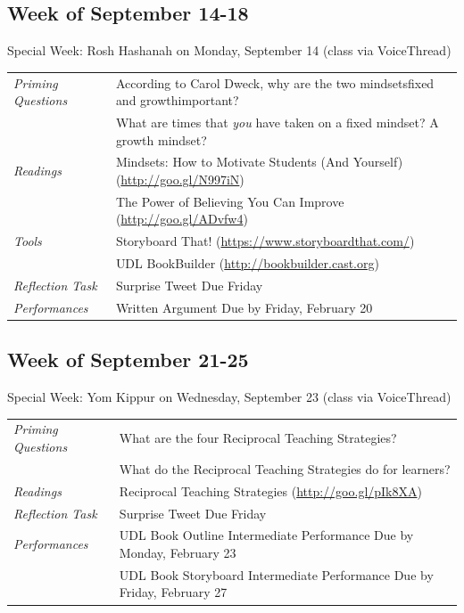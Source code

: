 \documentclass{tufte-handout}
\newcommand{\tabpq}{\faQuestionSign\medspace\textit{Priming Questions}}
\newcommand{\tabread}{\faBook\medspace\textit{Readings}}
\newcommand{\tabtools}{\faWrench\medspace\textit{Tools}}
\newcommand{\tabtweet}{\faLightbulb\medspace\textit{Reflection Task} & Surprise Tweet Due Friday \\}
\newcommand{\tabperformance}{\faTasks\medspace\textit{Performances}}
\newenvironment{tabsched}
	{\small
	\begin{tabular}{p{1.5in}p{5in}}
	\toprule}
	{\bottomrule
	\end{tabular}
	\normalsize}
\newenvironment{specweek}
	{\begin{center}
		\fontseries{b} \faBullhorn \medspace Special Week: }
		{\medspace \faBullhorn \fontseries{m}
	\end{center}}
\newcommand{\weekfive}{September 14-18}
\newcommand{\weeksix}{September 21-25}
\newcommand{\roshhashanah}{Rosh Hashanah on Monday, September 14 (class via VoiceThread)}
\newcommand{\yomkippur}{Yom Kippur on Wednesday, September 23 (class via VoiceThread)}
\begin{document}
\begin{fullwidth}
\subsection{Week of \weekfive}

\begin{specweek}\roshhashanah\end{specweek}

\begin{tabsched}
	\tabpq & According to Carol Dweck, why are the two mindsets\textemdash{}fixed and growth\textemdash{}important? \\
	& What are times that \emph{you} have taken on a fixed mindset? A growth mindset? \\
	\midrule
	\tabread & Mindsets: How to Motivate Students (And Yourself) (\url{http://goo.gl/N997iN}) \\
	& The Power of Believing You Can Improve (\url{http://goo.gl/ADvfw4}) \\
	\midrule
	\tabtools & Storyboard That! (\url{https://www.storyboardthat.com/}) \\
	& UDL BookBuilder (\url{http://bookbuilder.cast.org}) \\
	\midrule
	\tabtweet
	\midrule
	\tabperformance & Written Argument Due by Friday, February 20 \\
\end{tabsched}

\subsection{Week of \weeksix}

\begin{specweek}\yomkippur\end{specweek}

\begin{tabsched}
	\tabpq & What are the four Reciprocal Teaching Strategies? \\
	& What do the Reciprocal Teaching Strategies do for learners? \\
	\midrule
	\tabread & Reciprocal Teaching Strategies (\url{http://goo.gl/pIk8XA}) \\
	\midrule
	\tabtweet
	\midrule
	\tabperformance & UDL Book Outline Intermediate Performance Due by Monday, February 23 \\
	& UDL Book Storyboard Intermediate Performance Due by Friday, February 27 \\

\end{tabsched}


\end{fullwidth}
\end{document}
